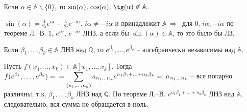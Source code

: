 \begin{corollary} \label{l14_cor4}
	Если $\alpha \in \mathbb{A} \backslash \{ 0 \}$, то $\sin(\alpha),\,\cos(\alpha),\,\tg(\alpha) \not\in \mathbb{A}$.
\end{corollary}
\begin{pf}
	$\sin(\alpha) = \frac{1}{2i}e^{i\alpha}-\frac{1}{2i}e^{-i\alpha}$. $i\alpha \ne -i\alpha$ и принадлежит $\mathbb{A} \ \Rightarrow \ $ для $0,\,i\alpha,-i\alpha$ по теореме Л.--В. 
	$1,\,e^{i\alpha},\,e^{-i\alpha}$ ЛНЗ, а если бы $\sin(\alpha) \in \mathbb{A}$, то это было бы ЛЗ.
\end{pf}

\begin{corollary} \label{l14_cor5}
	Если $\beta_1,\dots,\beta_k \in \mathbb{A}$ ЛНЗ над $\mathbb{Q}$, то $e^{\beta_1},\dots,e^{\beta_k}$ -- алгебраически независимы над $\mathbb{A}$.
\end{corollary}
\begin{pf}
	Пусть $f(x_1,\dots,x_k) \in \mathbb{A}[x_1,\dots,x_k]$. Тогда $\displaystyle f(e^{\beta_1},\dots,e^{\beta_k}) = \\ = \sum\limits_{(n_1,\dots,n_k)} a_{n_1\dots n_k}e^{n_1\beta_1+...+n_k\beta_k} =: \alpha_{n_1\dots n_k}$ -- все попарно различны, т.к. 
	$\beta_1,\dots,\beta_k$ ЛНЗ над $\mathbb{Q}$. По теореме Л.--В. 
	$e^{n_1\beta_1+...+n_k\beta_k}$ ЛНЗ над $\mathbb{A}$, следовательно, вся сумма не обращается в ноль.
\end{pf}